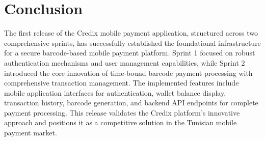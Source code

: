 \section*{Conclusion}

The first release of the Credix mobile payment application, structured across two comprehensive sprints, has successfully established the foundational infrastructure for a secure barcode-based mobile payment platform. Sprint 1 focused on robust authentication mechanisms and user management capabilities, while Sprint 2 introduced the core innovation of time-bound barcode payment processing with comprehensive transaction management. The implemented features include mobile application interfaces for authentication, wallet balance display, transaction history, barcode generation, and backend API endpoints for complete payment processing. This release validates the Credix platform's innovative approach and positions it as a competitive solution in the Tunisian mobile payment market.
